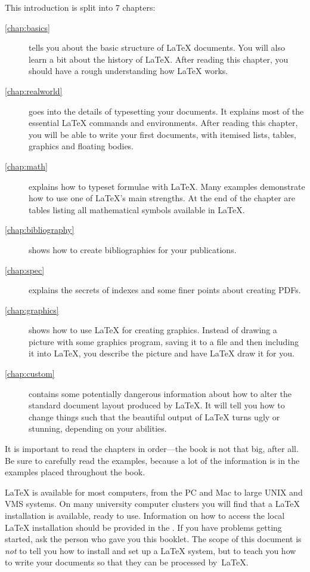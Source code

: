 \bigskip
\noindent This introduction is split into 7 chapters:
\begin{description}
  \item[\autoref{chap:basics}] tells you about the basic structure of
    \LaTeX{} documents. You will also learn a bit about the history of
    \LaTeX{}. After reading this chapter, you should have a rough understanding
    how \LaTeX{} works.
  \item[\autoref{chap:realworld}] goes into the details of typesetting your
    documents. It explains most of the essential \LaTeX{} commands and
    environments. After reading this chapter, you will be able to write your
    first documents, with itemised lists, tables, graphics and floating bodies.
  \item[\autoref{chap:math}] explains how to typeset formulae with \LaTeX.
    Many examples demonstrate how to use one of \LaTeX{}'s main strengths. At
    the end of the chapter are tables listing all mathematical symbols
    available in \LaTeX{}.
  \item[\autoref{chap:bibliography}] shows how to create bibliographies for
    your publications.
  \item[\autoref{chap:spec}] explains the secrets of indexes and some finer
    points about creating PDFs.
  \item[\autoref{chap:graphics}] shows how to use \LaTeX{} for creating
    graphics. Instead of drawing a picture with some graphics program, saving
    it to a file and then including it into \LaTeX{}, you describe the picture
    and have \LaTeX{} draw it for you.
  \item[\autoref{chap:custom}] contains some potentially dangerous
    information about how to alter the standard document layout produced by
    \LaTeX{}. It will tell you how  to change things such that the beautiful
    output of \LaTeX{} turns ugly or stunning, depending on your abilities.
\end{description}
\bigskip
\noindent It is important to read the chapters in order---the book is
not that big, after all. Be sure to carefully read the examples,
because a lot of the information is in the
examples placed throughout the book.

\bigskip
\noindent \LaTeX{} is available for most computers, from the PC and Mac to large
UNIX and VMS systems. On many university computer clusters you will
find that a \LaTeX{} installation is available, ready to use.
Information on how to access
the local \LaTeX{} installation should be provided in the \guide. If
you have problems getting started, ask the person who gave you this
booklet. The scope of this document is \emph{not} to tell you how to
install and set up a \LaTeX{} system, but to teach you how to write
your documents so that they can be processed by~\LaTeX{}.


